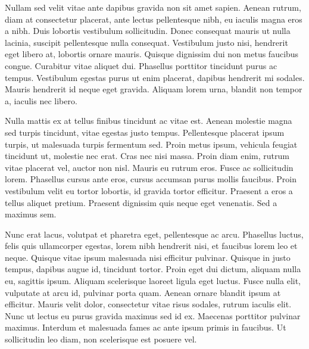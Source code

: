 Nullam sed velit vitae ante dapibus gravida non sit amet sapien. Aenean rutrum, diam at consectetur placerat, ante lectus pellentesque nibh, eu iaculis magna eros a nibh. Duis lobortis vestibulum sollicitudin. Donec consequat mauris ut nulla lacinia, suscipit pellentesque nulla consequat. Vestibulum justo nisi, hendrerit eget libero at, lobortis ornare mauris. Quisque dignissim dui non metus faucibus congue. Curabitur vitae aliquet dui. Phasellus porttitor tincidunt purus ac tempus. Vestibulum egestas purus ut enim placerat, dapibus hendrerit mi sodales. Mauris hendrerit id neque eget gravida. Aliquam lorem urna, blandit non tempor a, iaculis nec libero.

Nulla mattis ex at tellus finibus tincidunt ac vitae est. Aenean molestie magna sed turpis tincidunt, vitae egestas justo tempus. Pellentesque placerat ipsum turpis, ut malesuada turpis fermentum sed. Proin metus ipsum, vehicula feugiat tincidunt ut, molestie nec erat. Cras nec nisi massa. Proin diam enim, rutrum vitae placerat vel, auctor non nisl. Mauris eu rutrum eros. Fusce ac sollicitudin lorem. Phasellus cursus ante eros, cursus accumsan purus mollis faucibus. Proin vestibulum velit eu tortor lobortis, id gravida tortor efficitur. Praesent a eros a tellus aliquet pretium. Praesent dignissim quis neque eget venenatis. Sed a maximus sem.

Nunc erat lacus, volutpat et pharetra eget, pellentesque ac arcu. Phasellus luctus, felis quis ullamcorper egestas, lorem nibh hendrerit nisi, et faucibus lorem leo et neque. Quisque vitae ipsum malesuada nisi efficitur pulvinar. Quisque in justo tempus, dapibus augue id, tincidunt tortor. Proin eget dui dictum, aliquam nulla eu, sagittis ipsum. Aliquam scelerisque laoreet ligula eget luctus. Fusce nulla elit, vulputate at arcu id, pulvinar porta quam. Aenean ornare blandit ipsum at efficitur. Mauris velit dolor, consectetur vitae risus sodales, rutrum iaculis elit. Nunc ut lectus eu purus gravida maximus sed id ex. Maecenas porttitor pulvinar maximus. Interdum et malesuada fames ac ante ipsum primis in faucibus. Ut sollicitudin leo diam, non scelerisque est posuere vel.
